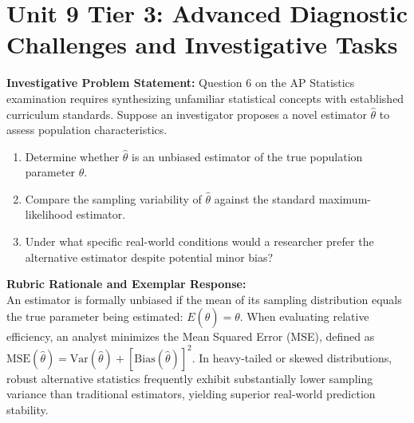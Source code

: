 \section{Unit 9 Tier 3: Advanced Diagnostic Challenges and Investigative Tasks}
\begin{frqrubricbox}
\textbf{Investigative Problem Statement:} Question 6 on the AP Statistics examination requires synthesizing unfamiliar statistical concepts with established curriculum standards. Suppose an investigator proposes a novel estimator $\hat{\theta}$ to assess population characteristics.
\begin{enumerate}[label=(\alph*)]
  \item Determine whether $\hat{\theta}$ is an unbiased estimator of the true population parameter $\theta$.
  \item Compare the sampling variability of $\hat{\theta}$ against the standard maximum-likelihood estimator.
  \item Under what specific real-world conditions would a researcher prefer the alternative estimator despite potential minor bias?
\end{enumerate}
\textbf{Rubric Rationale and Exemplar Response:}\\
An estimator is formally unbiased if the mean of its sampling distribution equals the true parameter being estimated: $E(\hat{\theta}) = \theta$. When evaluating relative efficiency, an analyst minimizes the Mean Squared Error (MSE), defined as $\text{MSE}(\hat{\theta}) = \text{Var}(\hat{\theta}) + [\text{Bias}(\hat{\theta})]^2$. In heavy-tailed or skewed distributions, robust alternative statistics frequently exhibit substantially lower sampling variance than traditional estimators, yielding superior real-world prediction stability.
\end{frqrubricbox}\vspace{6pt}
